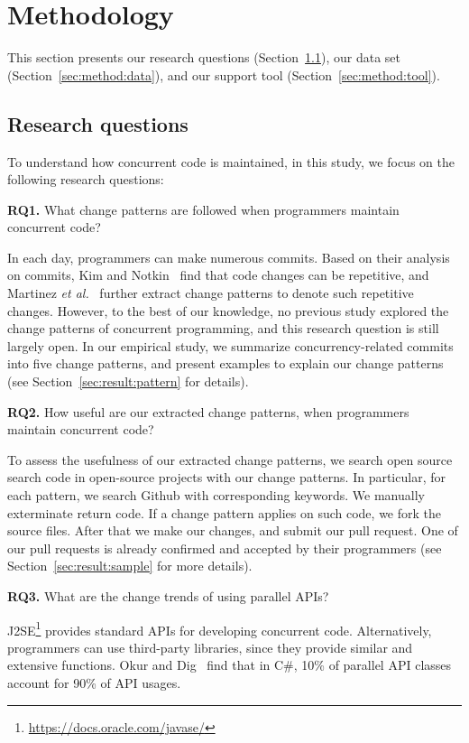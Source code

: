 \section{Methodology}
\label{sec:method}
This section presents our research questions (Section~\ref{sec:method:rq}), our data set (Section~\ref{sec:method:data}), and our support tool (Section~\ref{sec:method:tool}).
\subsection{Research questions}
\label{sec:method:rq}
To understand how concurrent code is maintained, in this study, we focus on the following research questions:

\textbf{RQ1.} What change patterns are followed when programmers maintain concurrent code?

In each day, programmers can make numerous commits. Based on their analysis on commits, Kim and Notkin~\cite{conf/icse/KimN09} find that code changes can be repetitive, and Martinez \emph{et al.}~\cite{conf/icsm/MartinezDM13} further extract change patterns to denote such repetitive changes. However, to the best of our knowledge, no previous study explored the change patterns of concurrent programming, and this research question is still largely open. In our empirical study, we summarize concurrency-related commits into five change patterns, and present examples to explain our change patterns (see Section~\ref{sec:result:pattern} for details).

\textbf{RQ2.} How useful are our extracted change patterns, when programmers maintain concurrent code?

To assess the usefulness of our extracted change patterns, we search open source search code in open-source projects with our change patterns. In particular, for each pattern, we search Github with corresponding keywords. We manually exterminate return code. If a change pattern applies on such code, we fork the source files. After that we make our changes, and submit our pull request. One of our pull requests is already confirmed and accepted by their programmers (see Section~\ref{sec:result:sample} for more details).

\textbf{RQ3.} What are the change trends of using parallel APIs?

J2SE\footnote{\url{https://docs.oracle.com/javase/}} provides standard APIs for developing concurrent code. Alternatively, programmers can use third-party libraries, since they provide similar and extensive functions. Okur and Dig~\cite{conf/sigsoft/OkurD12} find that in C\#, 10\% of parallel API classes account for 90\% of API usages.



